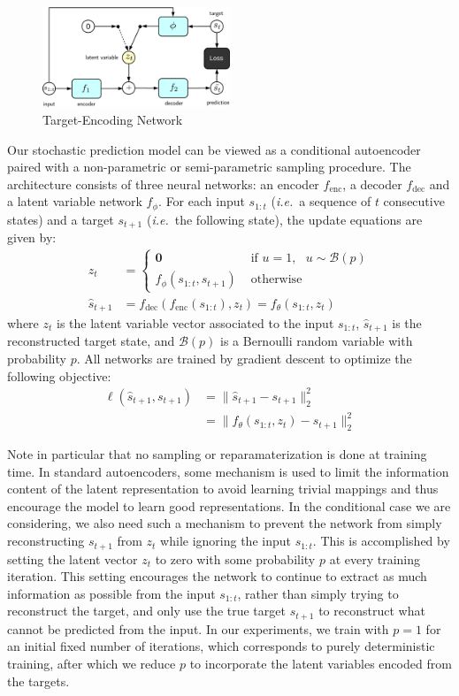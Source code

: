 \documentclass{article}
\begin{document}
\begin{figure}
  \centering
  \includegraphics[width=0.5\textwidth]{images/ae_train-crop.pdf}
  \caption{Target-Encoding Network}
\end{figure}

Our stochastic prediction model can be viewed as a conditional autoencoder paired with a non-parametric  or semi-parametric sampling procedure.
The architecture consists of three neural networks: an encoder $f_\text{enc}$, a decoder $f_\text{dec}$ and a latent variable network $f_\phi$.
For each input $s_{1:t}$ (\emph{i.e.}\ a sequence of $t$ consecutive states) and a target $s_{t+1}$ (\emph{i.e.}\ the following state), the update equations are given by:
%
\begin{align}
  \label{update-eqn}
  z_t &=
  \begin{cases}
    \bm{0} & \mbox{   if   } u = 1, \mbox{   } u \sim \mathcal{B}(p) \\
    f_\phi(s_{1:t}, s_{t+1}) & \mbox{   otherwise}
  \end{cases} \\
  \hat{s}_{t+1} &= f_\text{dec}(f_\text{enc}(s_{1:t}), z_t) = f_\theta(s_{1:t}, z_t)
\end{align}
%
where $z_t$ is the latent variable vector associated to the input $s_{1:t}$, $\hat{s}_{t + 1}$ is the reconstructed target state, and $\mathcal{B}(p)$ is a Bernoulli random variable with probability $p$.
All networks are trained by gradient descent to optimize the following objective:
%
\begin{align}
  \ell(\hat{s}_{t+1}, s_{t+1}) &= \lVert \hat{s}_{t+1} - s_{t+1} \rVert_2^2 \\
  &= \lVert f_\theta(s_{1:t}, z_t) - s_{t+1} \rVert_2^2
\end{align}

Note in particular that no sampling or reparamaterization is done at training time.
In standard autoencoders, some mechanism is used to limit the information content of the latent representation to avoid learning trivial mappings and thus encourage the model to learn good representations.
In the conditional case we are considering, we also need such a mechanism to prevent the network from simply reconstructing $s_{t+1}$ from $z_t$ while ignoring the input $s_{1:t}$.
This is accomplished by setting the latent vector $z_t$ to zero with some probability $p$ at every training iteration.
This setting encourages the network to continue to extract as much information as possible from the input $s_{1:t}$, rather than simply trying to reconstruct the target, and only use the true target $s_{t+1}$ to reconstruct what cannot be predicted from the input.
In our experiments, we train with $p=1$ for an initial fixed number of iterations, which corresponds to purely deterministic training, after which we reduce $p$ to incorporate the latent variables encoded from the targets.
\end{document}
